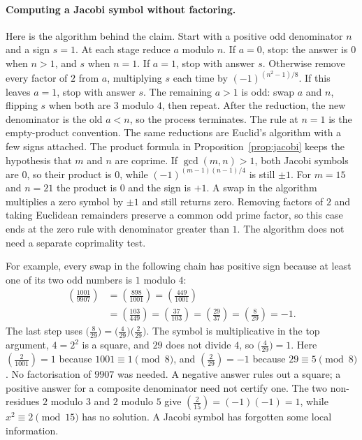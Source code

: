\paragraph{Computing a Jacobi symbol without factoring.}
Here is the algorithm behind the claim. Start with a positive odd denominator
$n$ and a sign $s=1$. At each stage reduce $a$ modulo $n$. If $a=0$, stop:
the answer is $0$ when $n>1$, and $s$ when $n=1$. If $a=1$, stop with
answer $s$. Otherwise remove every factor of $2$ from $a$, multiplying $s$
each time by $(-1)^{(n^2-1)/8}$. If this leaves $a=1$, stop with answer
$s$. The remaining $a>1$ is odd: swap $a$ and $n$, flipping $s$ when both
are $3$ modulo $4$, then repeat. After the reduction, the new denominator
is the old $a<n$, so the process terminates. The rule at $n=1$ is the
empty-product convention. The same reductions are Euclid's algorithm with
a few signs attached.
The product formula in Proposition~\ref{prop:jacobi} keeps the hypothesis that $m$ and $n$ are coprime. If $\gcd(m,n)>1$, both Jacobi symbols are $0$, so their product is $0$, while $(-1)^{(m-1)(n-1)/4}$ is still $\pm1$. For $m=15$ and $n=21$ the product is $0$ and the sign is $+1$. A swap in the algorithm multiplies a zero symbol by $\pm1$ and still returns zero. Removing factors of $2$ and taking Euclidean remainders preserve a common odd prime factor, so this case ends at the zero rule with denominator greater than $1$. The algorithm does not need a separate coprimality test.

For example, every swap in the following chain has positive sign because
at least one of its two odd numbers is $1$ modulo $4$:
\[
\begin{aligned}
\left(\frac{1001}{9907}\right)
 &=\left(\frac{898}{1001}\right)
 =\left(\frac{449}{1001}\right)\\
 &=\left(\frac{103}{449}\right)
 =\left(\frac{37}{103}\right)
 =\left(\frac{29}{37}\right)
 =\left(\frac8{29}\right)=-1.
\end{aligned}
\]
The last step uses $\bigl(\frac8{29}\bigr)=\bigl(\frac4{29}\bigr)\bigl(\frac2{29}\bigr)$. The symbol is multiplicative in the top argument, $4=2^2$ is a square, and $29$ does not divide $4$, so $\bigl(\frac4{29}\bigr)=1$. Here $\left(\frac2{1001}\right)=1$ because $1001\equiv1\pmod8$,
and $\left(\frac2{29}\right)=-1$ because $29\equiv5\pmod8$.
No factorisation of $9907$ was needed. A negative answer rules out a square;
a positive answer for a composite denominator need not certify one. The two
non-residues $2$ modulo $3$ and $2$ modulo $5$ give
$\left(\frac2{15}\right)=(-1)(-1)=1$, while $x^2\equiv2\pmod{15}$ has
no solution. A Jacobi symbol has forgotten some local information.

